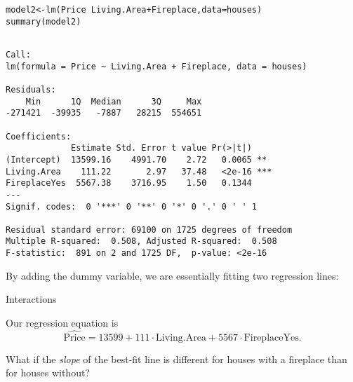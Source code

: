 \documentclass{beamer}\usepackage[]{graphicx}\usepackage[]{color}
\makeatletter
\newcommand{\hlopt}[1]{\textcolor[rgb]{1,0.894,0.769}{#1}}%
\newcommand{\hlstd}[1]{\textcolor[rgb]{1,0.894,0.769}{#1}}%
\newcommand{\hlkwb}[1]{\textcolor[rgb]{0.804,0.776,0.451}{#1}}%
\newcommand{\hlkwc}[1]{\textcolor[rgb]{0.78,0.941,0.545}{#1}}%
\newcommand{\hlkwd}[1]{\textcolor[rgb]{1,0.78,0.769}{#1}}%
\newenvironment{kframe}{%
 \def\at@end@of@kframe{}%
 \ifinner\ifhmode%
  \def\at@end@of@kframe{\end{minipage}}%
  \begin{minipage}{\columnwidth}%
 \fi\fi%
 \def\FrameCommand##1{\hskip\@totalleftmargin \hskip-\fboxsep
 \colorbox{shadecolor}{##1}\hskip-\fboxsep
     \hskip-\linewidth \hskip-\@totalleftmargin \hskip\columnwidth}%
 \MakeFramed {\advance\hsize-\width
   \@totalleftmargin\z@ \linewidth\hsize
   \@setminipage}}%
 {\par\unskip\endMakeFramed%
 \at@end@of@kframe}
\newenvironment{knitrout}{}{} %
\makeatother
\begin{document}
\begin{darkframes}
    \begin{frame}[fragile]
      \fontsize{8}{8}\selectfont
\begin{knitrout}
\begin{kframe}
\begin{alltt}
\hlstd{model2} \hlkwb{<-} \hlkwd{lm}\hlstd{(Price} \hlopt{~} \hlstd{Living.Area} \hlopt{+} \hlstd{Fireplace,} \hlkwc{data}\hlstd{=houses)}
\hlkwd{summary}\hlstd{(model2)}
\end{alltt}
\begin{verbatim}

Call:
lm(formula = Price ~ Living.Area + Fireplace, data = houses)

Residuals:
    Min      1Q  Median      3Q     Max 
-271421  -39935   -7887   28215  554651 

Coefficients:
             Estimate Std. Error t value Pr(>|t|)    
(Intercept)  13599.16    4991.70    2.72   0.0065 ** 
Living.Area    111.22       2.97   37.48   <2e-16 ***
FireplaceYes  5567.38    3716.95    1.50   0.1344    
---
Signif. codes:  0 '***' 0 '**' 0 '*' 0 '.' 0 ' ' 1

Residual standard error: 69100 on 1725 degrees of freedom
Multiple R-squared:  0.508,	Adjusted R-squared:  0.508 
F-statistic:  891 on 2 and 1725 DF,  p-value: <2e-16
\end{verbatim}
\end{kframe}
\end{knitrout}
    \end{frame}

    \begin{frame}
      By adding the dummy variable, we are essentially fitting two regression lines:
\begin{knitrout}


\end{knitrout}
    \end{frame}

    \begin{frame}{Interactions}
      \begin{center}
        Our regression equation is
        \[
          \widehat{\text{Price}} = 13599
            + 111 \cdot\text{Living.Area}
            + 5567 \cdot\text{FireplaceYes}.
        \]
        
        \bigskip\pause

        What if the \emph{slope} of the best-fit line is different for houses with a fireplace than for houses without?


\end{center}
\end{frame}
\end{darkframes}
\end{document}
